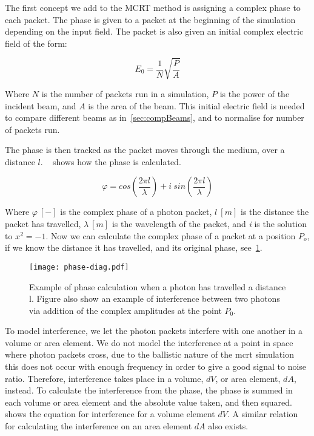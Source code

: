 The first concept we add to the MCRT method is assigning a complex phase to each packet.
The phase is given to a packet at the beginning of the simulation depending on the input field.
The packet is also given an initial complex electric field of the form:

\begin{equation}
E_0 = \frac{1}{N}\sqrt{\frac{P}{A}}
\label{eqn:initefield}
\end{equation}

Where $N$ is the number of packets run in a simulation, $P$ is the power of the incident beam, and $A$ is the area of the beam.
This initial electric field is needed to compare different beams as in~\cref{sec:compBeams}, and to normalise for number of packets run.

The phase is then tracked as the packet moves through the medium, over a distance $l$.
~ shows how the phase is calculated.

\begin{equation}
    \varphi = cos\left(\frac{2 \pi l}{\lambda}\right) + i\ sin\left(\frac{2 \pi l}{\lambda}\right)
    \label{eqn:phase}
\end{equation}

Where $\varphi~[-]$ is the complex phase of a photon packet, $l\ [m]$ is the distance the packet has travelled, $\lambda~[m]$ is the wavelength of the packet, and \textit{i} is the solution to $x^2=-1$.
Now we can calculate the complex phase of a packet at a position $P_o$, if we know the distance it has travelled, and its original phase, see~\cref{fig:phase-diag}.

\begin{figure}[!ht]
    \centering
    \texttt{[image: phase-diag.pdf]}
    \caption{Example of phase calculation when a photon has travelled a distance l. Figure also show an example of interference between two photons via addition of the complex amplitudes at the point $P_0$.}
    \label{fig:phase-diag}
\end{figure}

To model interference, we let the photon packets interfere with one another in a volume or area element. 
We do not model the interference at a point in space where photon packets cross, due to the ballistic nature of the \gls*{mcrt} simulation this does not occur with enough frequency in order to give a good signal to noise ratio. 
Therefore, interference takes place in a volume, $dV$, or area element, $dA$, instead.
To calculate the interference from the phase, the phase is summed in each volume or area element and the absolute value taken, and then squared.~ shows the equation for interference for a volume element $dV$. A similar relation for calculating the interference on an area element $dA$ also exists.

